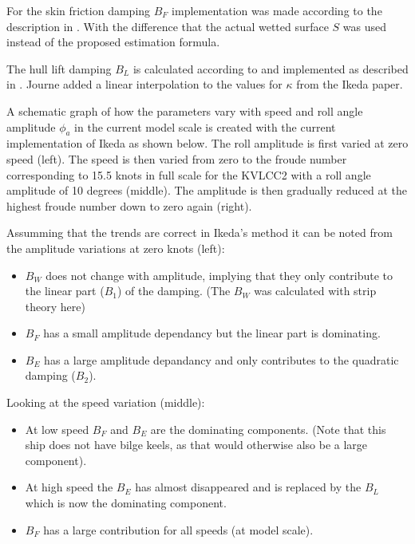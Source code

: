 For the skin friction damping \(B_F\) implementation was made according
to the description in \cite{7505983/UGK6YEVD}. With the difference that
the actual wetted surface \(S\) was used instead of the proposed
estimation formula.

The hull lift damping \(B_L\) is calculated according to
\cite{7505983/937PN5DT} and implemented as described in
\cite{7505983/UYUAYY7E}. Journe added a linear interpolation to the
values for \(\kappa\) from the Ikeda paper.

A schematic graph of how the parameters vary with speed and roll angle
amplitude \(\phi_a\) in the current model scale is created with the
current implementation of Ikeda as shown below. The roll amplitude is
first varied at zero speed (left). The speed is then varied from zero to
the froude number corresponding to 15.5 knots in full scale for the
KVLCC2 with a roll angle amplitude of 10 degrees (middle). The amplitude
is then gradually reduced at the highest froude number down to zero
again (right).

Assumming that the trends are correct in Ikeda's method it can be noted
from the amplitude variations at zero knots (left):

\begin{itemize}
\item $B_W$ does not change with amplitude, implying that they only contribute to the linear part ($B_1$) of the damping. (The $B_W$ was calculated with strip theory here)
\item $B_F$ has a small amplitude dependancy but the linear part is dominating.
\item $B_E$ has a large amplitude depandancy and only contributes to the quadratic damping ($B_2$)\cite{7505983/4AFVVGNT}.
\end{itemize}

Looking at the speed variation (middle):

\begin{itemize}
\item At low speed $B_F$ and $B_E$ are the dominating components. (Note that this ship does not have bilge keels, as that would otherwise also be a large component).
\item At high speed the $B_E$ has almost disappeared and is replaced by the $B_L$ which is now the dominating component.
\item $B_F$ has a large contribution for all speeds (at model scale).
\end{itemize}

